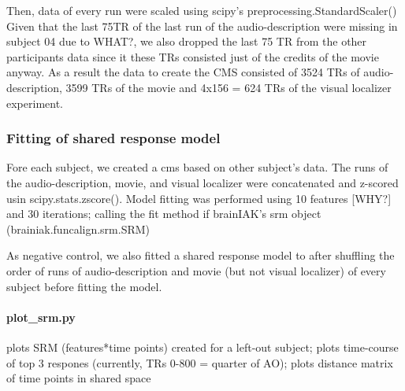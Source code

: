 Then, data of every run were scaled using scipy's preprocessing.StandardScaler()
Given that the last 75TR of the last run of the audio-description were missing
in subject 04 due to WHAT?, we also dropped the last 75 TR from the other
participants data since it these TRs consisted just of the credits of the movie
anyway.
As a result the data to create the CMS consisted of 3524 TRs of
audio-description, 3599 TRs of the movie and 4x156 = 624 TRs of the visual
localizer experiment.

\subsubsection{Fitting of shared response model}




Fore each subject, we created a \ac{cms} based on other subject's data.
%
The runs of the audio-description, movie, and visual localizer were concatenated
and z-scored usin scipy.stats.zscore().
Model fitting was performed using 10 features [WHY?] and 30 iterations;
calling the fit method if brainIAK's srm object (brainiak.funcalign.srm.SRM)

As negative control, we also fitted a shared response model to after shuffling
the order of runs of audio-description and movie (but not visual localizer) of
every subject before fitting the model.


\paragraph{plot\_srm.py}

%
plots SRM (features*time points) created for a left-out subject; plots
time-course of top 3 respones (currently, TRs 0-800 = quarter of AO); plots
distance matrix of time points in shared space


